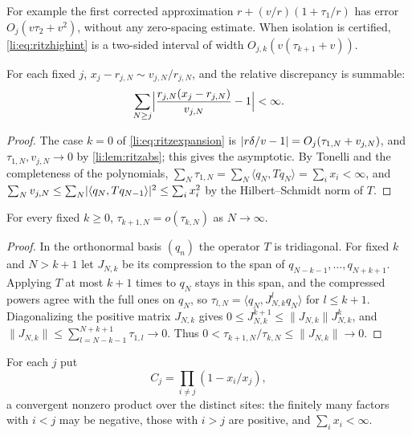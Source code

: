 For example the first corrected approximation $r+(v/r)(1+\tau_1/r)$ has error $O_j(v\tau_2+v^2)$,
without any zero-spacing estimate. When isolation is certified, \eqref{li:eq:ritzhighint} is a
two-sided interval of width $O_{j,k}(v(\tau_{k+1}+v))$.

\begin{corollary}[Asymptotically sharp computable residual: $k=0$; \stU]\label{li:thm:ritzsharp}
For each fixed $j$, $x_j-r_{j,N}\sim v_{j,N}/r_{j,N}$, and the relative discrepancy is summable:
\[
 \sum_{N\ge j}\Bigl\lvert\frac{r_{j,N}(x_j-r_{j,N})}{v_{j,N}}-1\Bigr\rvert<\infty .
\]
\end{corollary}

\begin{proof}
The case $k=0$ of \eqref{li:eq:ritzexpansion} is $\lvert r\delta/v-1\rvert=O_j(\tau_{1,N}+v_{j,N})$, and
$\tau_{1,N},v_{j,N}\to0$ by \cref{li:lem:ritzabs}; this gives the asymptotic. By Tonelli and the
completeness of the polynomials, $\sum_N\tau_{1,N}=\sum_N\langle q_N,Tq_N\rangle=\sum_ix_i<\infty$,
and $\sum_Nv_{j,N}\le\sum_N\lvert\langle q_N,Tq_{N-1}\rangle\rvert^2\le\sum_ix_i^2$ by the
Hilbert--Schmidt norm of $T$.
\end{proof}

\begin{lemma}\label{li:lem:ritzhier}
For every fixed $k\ge0$, $\tau_{k+1,N}=o(\tau_{k,N})$ as $N\to\infty$.
\end{lemma}

\begin{proof}
In the orthonormal basis $(q_n)$ the operator $T$ is tridiagonal. For fixed $k$ and $N>k+1$ let
$J_{N,k}$ be its compression to the span of $q_{N-k-1},\dots,q_{N+k+1}$. Applying $T$ at most $k+1$
times to $q_N$ stays in this span, and the compressed powers agree with the full ones on $q_N$, so
$\tau_{l,N}=\langle q_N,J_{N,k}^lq_N\rangle$ for $l\le k+1$. Diagonalizing the positive matrix
$J_{N,k}$ gives $0\le J_{N,k}^{k+1}\le\lVert J_{N,k}\rVert J_{N,k}^k$, and
$\lVert J_{N,k}\rVert\le\sum_{l=N-k-1}^{N+k+1}\tau_{1,l}\to0$. Thus
$0<\tau_{k+1,N}/\tau_{k,N}\le\lVert J_{N,k}\rVert\to0$.
\end{proof}

For each $j$ put
\begin{equation}\label{li:eq:ritzC}
 C_j=\prod_{i\ne j}(1-x_i/x_j),
\end{equation}
a convergent nonzero product over the distinct sites: the finitely many factors with $i<j$ may be
negative, those with $i>j$ are positive, and $\sum_ix_i<\infty$.

